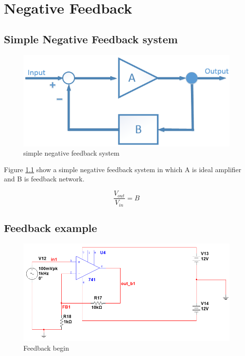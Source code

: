 \chapter{Negative Feedback}
\section{Simple Negative Feedback system}

\begin{figure}[htbp]
	\centering
	\includegraphics[scale=0.6]{"../Photo/Chap2/Feedback system"}
	\caption{simple negative feedback system}
	\label{fig:Feedback system}
\end{figure}

Figure \ref{fig:Feedback system} show a simple negative feedback system in which A is ideal amplifier and B is feedback network. 

\[  \frac{V_{out}}{V_{in}} = B  \] 

\section{Feedback example}

\begin{figure}[htbp]
	\centering
	\includegraphics[scale=0.6]{"../Photo/Chap2/Feed_back_ini"}
	\caption{Feedback begin}
	\label{fig:Feedback begin}
\end{figure}

